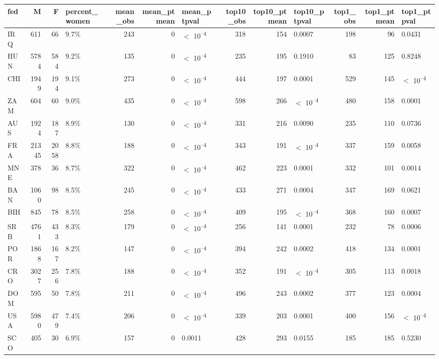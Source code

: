 
\begin{tabular}{l|r|r|l|r|r|l|r|r|l|r|r|l}
\hline
fed & M & F & percent_women & mean_obs & mean_ptmean & mean_ptpval & top10_obs & top10_ptmean & top10_ptpval & top1_obs & top1_ptmean & top1_ptpval\\
\hline
IRQ & 611 & 66 & 9.7\% & 243 & 0 & $<$ 10\textsuperscript{--4} & 318 & 154 & 0.0007 & 198 & 96 & 0.0431\\
\hline
HUN & 5784 & 584 & 9.2\% & 135 & 0 & $<$ 10\textsuperscript{--4} & 235 & 195 & 0.1910 & 83 & 125 & 0.8248\\
\hline
CHI & 1949 & 194 & 9.1\% & 273 & 0 & $<$ 10\textsuperscript{--4} & 444 & 197 & 0.0001 & 529 & 145 & $<$ 10\textsuperscript{--4}\\
\hline
ZAM & 604 & 60 & 9.0\% & 435 & 0 & $<$ 10\textsuperscript{--4} & 598 & 266 & $<$ 10\textsuperscript{--4} & 480 & 158 & 0.0001\\
\hline
AUS & 1924 & 187 & 8.9\% & 130 & 0 & $<$ 10\textsuperscript{--4} & 331 & 216 & 0.0090 & 235 & 110 & 0.0736\\
\hline
FRA & 21345 & 2058 & 8.8\% & 188 & 0 & $<$ 10\textsuperscript{--4} & 343 & 191 & $<$ 10\textsuperscript{--4} & 337 & 159 & 0.0058\\
\hline
MNE & 378 & 36 & 8.7\% & 322 & 0 & $<$ 10\textsuperscript{--4} & 462 & 223 & 0.0001 & 332 & 101 & 0.0014\\
\hline
BAN & 1060 & 98 & 8.5\% & 245 & 0 & $<$ 10\textsuperscript{--4} & 433 & 271 & 0.0004 & 347 & 169 & 0.0621\\
\hline
BIH & 845 & 78 & 8.5\% & 258 & 0 & $<$ 10\textsuperscript{--4} & 409 & 195 & $<$ 10\textsuperscript{--4} & 368 & 160 & 0.0007\\
\hline
SRB & 4761 & 433 & 8.3\% & 179 & 0 & $<$ 10\textsuperscript{--4} & 256 & 141 & 0.0001 & 232 & 78 & 0.0006\\
\hline
POR & 1868 & 167 & 8.2\% & 147 & 0 & $<$ 10\textsuperscript{--4} & 394 & 242 & 0.0002 & 418 & 134 & 0.0001\\
\hline
CRO & 3027 & 256 & 7.8\% & 188 & 0 & $<$ 10\textsuperscript{--4} & 352 & 191 & $<$ 10\textsuperscript{--4} & 305 & 113 & 0.0018\\
\hline
DOM & 595 & 50 & 7.8\% & 211 & 0 & $<$ 10\textsuperscript{--4} & 496 & 243 & 0.0002 & 377 & 123 & 0.0004\\
\hline
USA & 5980 & 479 & 7.4\% & 206 & 0 & $<$ 10\textsuperscript{--4} & 339 & 203 & 0.0001 & 400 & 156 & $<$ 10\textsuperscript{--4}\\
\hline
SCO & 405 & 30 & 6.9\% & 157 & 0 & 0.0011 & 428 & 293 & 0.0155 & 185 & 185 & 0.5230\\

\end{tabular}

